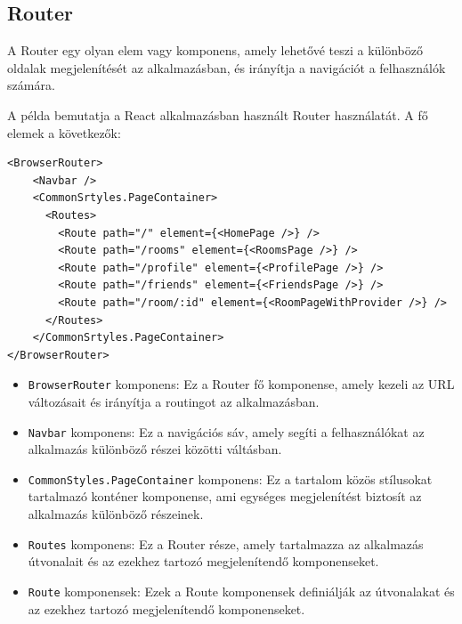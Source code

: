 \subsection{Router}
A Router egy olyan elem vagy komponens, amely lehetővé teszi a különböző oldalak megjelenítését az alkalmazásban, és irányítja a navigációt a felhasználók számára.

A példa bemutatja a React alkalmazásban használt Router használatát. A fő elemek a következők:
\begin{lstlisting}[style=Csharp,caption={Router}]
<BrowserRouter>
    <Navbar />
    <CommonSrtyles.PageContainer>
      <Routes>
        <Route path="/" element={<HomePage />} />
        <Route path="/rooms" element={<RoomsPage />} />
        <Route path="/profile" element={<ProfilePage />} />
        <Route path="/friends" element={<FriendsPage />} />
        <Route path="/room/:id" element={<RoomPageWithProvider />} />
      </Routes>
    </CommonSrtyles.PageContainer>
</BrowserRouter>
\end{lstlisting}
\vspace{1em}
\begin{itemize}
\item \texttt{BrowserRouter} komponens: Ez a Router fő komponense, amely kezeli az URL változásait és irányítja a routingot az alkalmazásban.
\item \texttt{Navbar} komponens: Ez a navigációs sáv, amely segíti a felhasználókat az alkalmazás különböző részei közötti váltásban.

\item \texttt{CommonStyles.PageContainer} komponens: Ez a tartalom közös stílusokat tartalmazó konténer komponense, ami egységes megjelenítést biztosít az alkalmazás különböző részeinek.

\item \texttt{Routes} komponens: Ez a Router része, amely tartalmazza az alkalmazás útvonalait és az ezekhez tartozó megjelenítendő komponenseket.

\item \texttt{Route} komponensek: Ezek a Route komponensek definiálják az útvonalakat és az ezekhez tartozó megjelenítendő komponenseket.
\end{itemize}
\vspace{1em}

